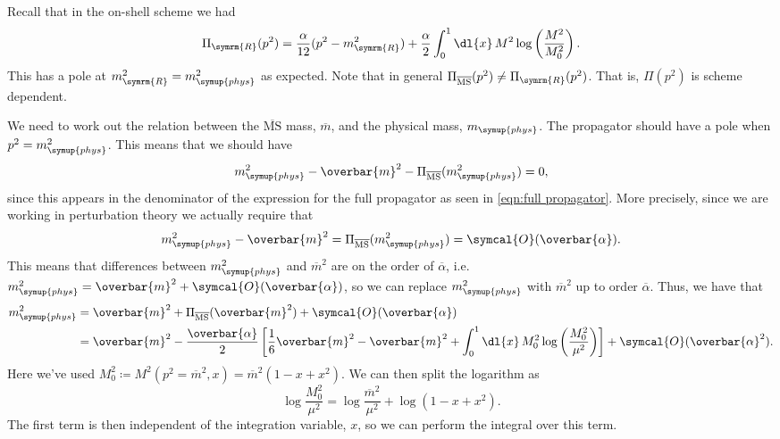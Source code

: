 \documentclass[fleqn]{NotesClass}
\newcommand*{\MSbar}{\ensuremath{\overline{\text{MS}}}}
\newcommand{\order}{\symcal{O}}
\newcommand{\phys}{\symup{phys}}
\newcommand{\renormalised}{\symrm{R}}
\begin{document}
    Recall that in the on-shell scheme we had
    \begin{equation}
        \Pi_{\renormalised}(p^2) = \frac{\alpha}{12}(p^2 - m_{\renormalised}^2) + \frac{\alpha}{2} \int_0^1 \dl{x} \, M^2 \log\left( \frac{M^2}{M_0^2} \right).
    \end{equation}
    This has a pole at \(m_{\renormalised}^2 = m_{\phys}^2\) as expected.
    Note that in general \(\Pi_{\MSbar}(p^2) \ne \Pi_{\renormalised}(p^2)\).
    That is, \(\Pi(p^2)\) is scheme dependent.
    
    We need to work out the relation between the \MSbar{} mass, \(\overbar{m}\), and the physical mass, \(m_{\phys}\).
    The propagator should have a pole when \(p^2 = m_{\phys}^2\).
    This means that we should have
    \begin{equation}
        m_{\phys}^2 - \overbar{m}^2 - \Pi_{\MSbar}(m_{\phys}^2) = 0,
    \end{equation}
    since this appears in the denominator of the expression for the full propagator as seen in \cref{eqn:full propagator}.
    More precisely, since we are working in perturbation theory we actually require that
    \begin{equation}
        m_{\phys}^2 - \overbar{m}^2 = \Pi_{\MSbar}(m_{\phys}^2) = \order(\overbar{\alpha}).
    \end{equation}
    This means that differences between \(m_{\phys}^2\) and \(\overbar{m}^2\) are on the order of \(\overbar{\alpha}\), i.e.\@ \(m_{\phys}^2 = \overbar{m}^2 + \order(\overbar{\alpha})\), so we can replace \(m_{\phys}^2\) with \(\overbar{m}^2\) up to order \(\overbar{\alpha}\).
    Thus, we have that
    \begin{align}
        m_{\phys}^2 &= \overbar{m}^2 + \Pi_{\MSbar}(\overbar{m}^2) + \order(\overbar{\alpha})\\
        &= \overbar{m}^2 - \frac{\overbar{\alpha}}{2}\left[ \frac{1}{6}\overbar{m}^2 - \overbar{m}^2 + \int_0^1 \dl{x} \, M_0^2 \log\left( \frac{M_0^2}{\mu^2} \right) \right] + \order(\overbar{\alpha}^2).
    \end{align}
    Here we've used \(M_0^2 \coloneqq M^2(p^2 = \overbar{m}^2, x) = \overbar{m}^2(1 - x + x^2)\).
    We can then split the logarithm as
    \begin{equation}
        \log\frac{M_0^2}{\mu^2} = \log\frac{\overbar{m}^2}{\mu^2} + \log(1 - x + x^2).
    \end{equation}
    The first term is then independent of the integration variable, \(x\), so we can perform the integral over this term.
\end{document}
